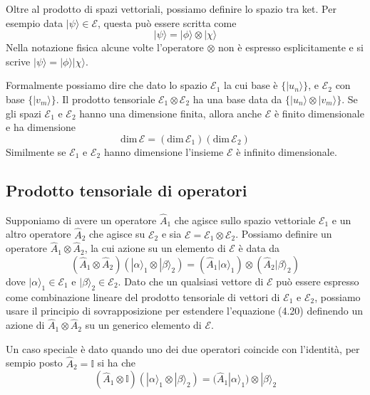  Oltre al prodotto di spazi vettoriali, possiamo definire lo spazio tra ket. Per esempio data $|\psi \rangle \in \mathcal{E}$, questa pu\`o essere scritta come 
 \begin{equation*}
 	|\psi \rangle = |\phi \rangle \otimes |\chi \rangle
 \end{equation*}
 Nella notazione fisica alcune volte l'operatore $\otimes$ non \`e espresso esplicitamente e si scrive $|\psi \rangle = |\phi \rangle |\chi \rangle $.
 
 Formalmente possiamo dire che dato lo spazio $\mathcal{E}_1$ la cui base \`e $\{|u_n \rangle\} $, e $\mathcal{E}_2$ con base $\{|v_{m} \rangle\}$. Il prodotto tensoriale $\mathcal{E}_1 \otimes \mathcal{E}_2$ ha una base data da $\{|u_n \rangle \otimes |v_m \rangle\} $. Se gli spazi $\mathcal{E}_1$ e $\mathcal{E}_2$ hanno una dimensione finita, allora anche $\mathcal{E}$ \`e finito dimensionale e ha dimensione
 \begin{equation*}
 	\text{dim} \,\mathcal{E} = (\text{dim} \,\mathcal{E}_1)(\text{dim} \,\mathcal{E}_2) 
 \end{equation*}
Similmente se $\mathcal{E}_1$ e $\mathcal{E}_2$ hanno dimensione l'insieme $\mathcal{E}$ \`e infinito dimensionale.
\subsection{Prodotto tensoriale di operatori}

Supponiamo di avere un operatore $\hat{A}_1$ che agisce sullo spazio vettoriale $\mathcal{E}_1$ e un altro operatore $\hat{A}_2$ che agisce su $\mathcal{E}_2$ e sia $\mathcal{E} = \mathcal{E}_1 \otimes \mathcal{E}_2$.  Possiamo definire un operatore $\hat{A}_1 \otimes \hat{A}_2$, la cui azione su un elemento di $\mathcal{E}$ \`e data da
\begin{equation}
	(\hat{A}_1 \otimes \hat{A}_2)(|\alpha \rangle_{1} \otimes |\beta \rangle_2) = (\hat{A}_1|\alpha \rangle_{1}) \otimes (\hat{A}_2|\beta \rangle_2)
\end{equation}
dove $|\alpha \rangle_1  \in \mathcal{E}_1$ e $|\beta \rangle_2 \in \mathcal{E}_2$. Dato che un qualsiasi vettore di $\mathcal{E}$ pu\`o essere espresso come combinazione lineare del prodotto tensoriale di vettori di $\mathcal{E}_1$ e $\mathcal{E}_2$, possiamo usare il principio di sovrapposizione per estendere l'equazione (4.20)  definendo un azione di $\hat{A}_1 \otimes \hat{A}_2$ su un generico elemento di $\mathcal{E}$.

Un caso speciale \`e dato quando uno dei due operatori coincide con l'identit\`a, per sempio posto $\hat{A}_2 = \mathbb{I}$ si ha che 
\begin{equation*}
	(\hat{A}_1 \otimes \mathbb{I})(|\alpha \rangle_1 \otimes |\beta \rangle_2) = (\hat{A}_1|\alpha \rangle_1 )\otimes |\beta \rangle_2
\end{equation*}
\newpage

